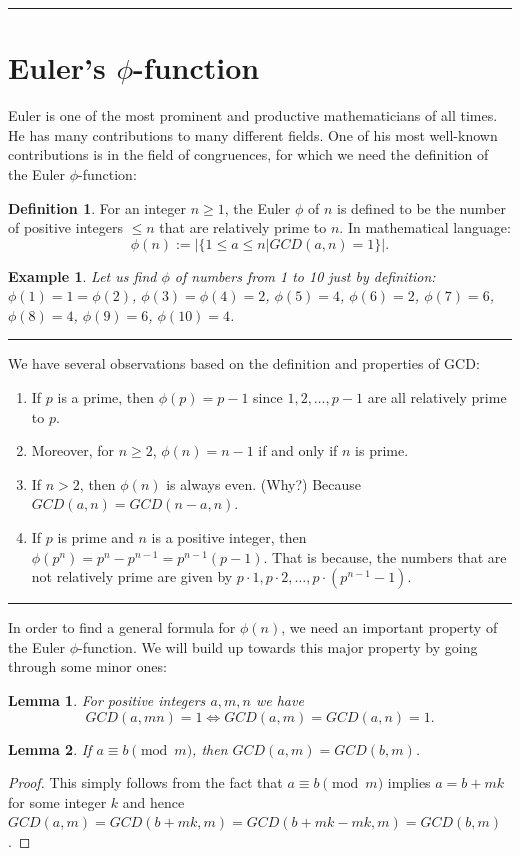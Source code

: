 \documentclass[12pt]{article}
\theoremstyle{plain}
\newtheorem{lemma}{Lemma}
\newtheorem{example}{Example}
\theoremstyle{definition}
\newtheorem{definition}{Definition}
\theoremstyle{remark}
\begin{document}
\bigskip
\hrule

\section{Euler's $\phi$-function}
Euler is one of the most prominent and productive mathematicians of all times. He has many contributions to many different fields. One of his most well-known contributions is in the field of congruences, for which we need the definition of the Euler $\phi$-function:
\begin{definition}
For an integer $n\geq 1$, the Euler $\phi$ of $n$ is defined to be the number of positive integers $\leq n$ that are relatively prime to $n$. In mathematical language:
$$\phi(n):= |\{1\leq a \leq n| GCD(a,n)=1\}|.$$
\end{definition}
\begin{example}
Let us find $\phi$ of numbers from 1 to 10 just by definition:
$\phi(1)=1=\phi(2)$, $\phi(3)=\phi(4)=2$, $\phi(5)=4$, $\phi(6)=2$, $\phi(7)=6$, $\phi(8)=4$, $\phi(9)=6$, $\phi(10)=4$.
\end{example}
\hrule

\bigskip
\noindent
We have several observations based on the definition and properties of GCD:
\begin{enumerate}
    \item If $p$ is a prime, then $\phi(p) = p-1$ since $1,2, \dots, p-1$ are all relatively prime to $p$.
 \item Moreover, for $n\geq 2$, $\phi(n) = n-1$ if and only if $n$ is prime.
 \item If $n>2$, then $\phi(n)$ is always even. (Why?)
 Because $GCD(a,n)=GCD(n-a,n)$.
 \item If $p$ is prime and $n$ is a positive integer, then 
 $\phi(p^n)=p^n-p^{n-1} = p^{n-1}(p-1)$. That is because, the numbers that are not relatively prime are given by $p\cdot 1, p\cdot 2, \dots, p\cdot (p^{n-1}-1)$.
\end{enumerate}
\hrule

\bigskip
\noindent
In order to find a general formula for $\phi(n)$, we need an important property of the Euler $\phi$-function. We will build up towards this major property by going through some minor ones:
\begin{lemma}
For positive integers $a, m, n$ we have 
$$GCD(a,mn)=1 \Leftrightarrow GCD(a,m)=GCD(a,n)=1.$$
\end{lemma}

\bigskip
\noindent
\begin{lemma}
If $a\equiv b \pmod{m}$, then $GCD(a,m)=GCD(b,m)$.
\end{lemma}
\begin{proof}
This simply follows from the fact that $a\equiv b \pmod{m}$ implies $a=b+mk$ for some integer $k$ and hence 
$GCD(a,m) = GCD(b+mk,m) = GCD(b+mk-mk,m) = GCD(b,m)$. 
\end{proof}
\end{document}
